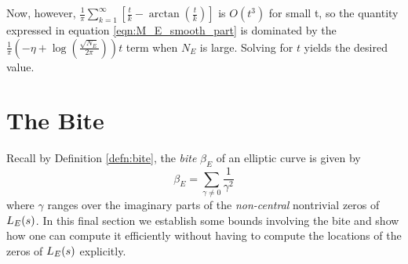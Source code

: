 Now, however, $\frac{1}{\pi}\sum_{k=1}^{\infty} \left[\frac{t}{k} - \arctan\left(\frac{t}{k}\right)\right]$ is $O(t^3)$ for small t, so the quantity expressed in equation \ref{eqn:M_E_smooth_part} is dominated by the $\frac{1}{\pi}\left(-\eta+\log\left(\frac{\sqrt{N_E}}{2\pi}\right)\right) t$ term when $N_E$ is large. Solving for $t$ yields the desired value.

\newpage
\section{The Bite}\label{sec:bite}

Recall by Definition \ref{defn:bite}, the {\it bite} $\beta_E$ of an elliptic curve is given by
\begin{equation}
\beta_E = \sum_{\gamma \ne 0} \frac{1}{\gamma^2}
\end{equation}
where $\gamma$ ranges over the imaginary parts of the {\it non-central} nontrivial zeros of $L_E(s)$. In this final section we establish some bounds involving the bite and show how one can compute it efficiently without having to compute the locations of the zeros of $L_E(s)$ explicitly. \\%

